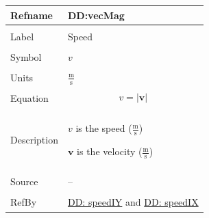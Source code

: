 \documentclass[12pt]{article}
\begin{document}
\noindent \begin{minipage}{\textwidth}
\begin{tabular}{p{} p{}}
\toprule \textbf{Refname} & \textbf{DD:vecMag}
\label{DD:vecMag}
\\ \midrule \\
Label & Speed
\\ \midrule \\
Symbol & $v$
\\ \midrule \\
Units & $\frac{\text{m}}{\text{s}}$
\\ \midrule \\
Equation & \begin{displaymath}
           v=|\mathbf{v}|
           \end{displaymath}
\\ \midrule \\
Description & \begin{symbDescription}
              \item{$v$ is the speed ($\frac{\text{m}}{\text{s}}$)}
              \item{$\mathbf{v}$ is the velocity ($\frac{\text{m}}{\text{s}}$)}
              \end{symbDescription}
\\ \midrule \\
Source & --
\\ \midrule \\
RefBy & \hyperref[DD:speedIY]{DD: speedIY} and \hyperref[DD:speedIX]{DD: speedIX}
\\ \bottomrule \end{tabular}
\end{minipage}
\par~
\end{document}
